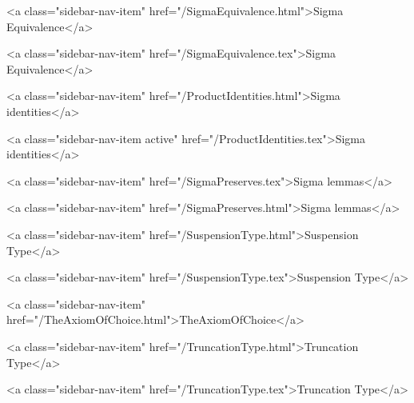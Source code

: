      
    
      
        
          <a class="sidebar-nav-item" href="/SigmaEquivalence.html">Sigma Equivalence</a>
        
      
    
      
        
          <a class="sidebar-nav-item" href="/SigmaEquivalence.tex">Sigma Equivalence</a>
        
      
    
      
        
          <a class="sidebar-nav-item" href="/ProductIdentities.html">Sigma identities</a>
        
      
    
      
        
          <a class="sidebar-nav-item active" href="/ProductIdentities.tex">Sigma identities</a>
        
      
    
      
        
          <a class="sidebar-nav-item" href="/SigmaPreserves.tex">Sigma lemmas</a>
        
      
    
      
        
          <a class="sidebar-nav-item" href="/SigmaPreserves.html">Sigma lemmas</a>
        
      
    
      
        
          <a class="sidebar-nav-item" href="/SuspensionType.html">Suspension Type</a>
        
      
    
      
        
          <a class="sidebar-nav-item" href="/SuspensionType.tex">Suspension Type</a>
        
      
    
      
        
          <a class="sidebar-nav-item" href="/TheAxiomOfChoice.html">TheAxiomOfChoice</a>
        
      
    
      
        
          <a class="sidebar-nav-item" href="/TruncationType.html">Truncation Type</a>
        
      
    
      
        
          <a class="sidebar-nav-item" href="/TruncationType.tex">Truncation Type</a>
        
